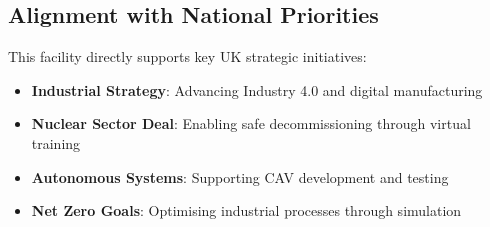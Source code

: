 \subsection{Alignment with National Priorities}

This facility directly supports key UK strategic initiatives:

\begin{itemize}
    \item \textbf{Industrial Strategy}: Advancing Industry 4.0 and digital manufacturing
    \item \textbf{Nuclear Sector Deal}: Enabling safe decommissioning through virtual training
    \item \textbf{Autonomous Systems}: Supporting CAV development and testing
    \item \textbf{Net Zero Goals}: Optimising industrial processes through simulation
\end{itemize}